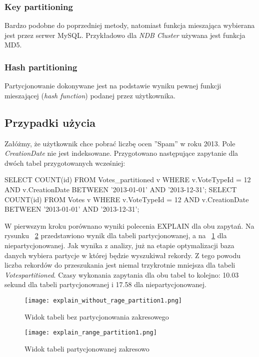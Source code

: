 \subsubsection{Key partitioning}
Bardzo podobne do poprzedniej metody, natomiast funkcja mieszająca wybierana jest przez serwer MySQL. Przykładowo dla \textit{NDB Cluster} używana jest funkcja MD5.
\subsubsection{Hash partitioning}
Partycjonowanie dokonywane jest na podstawie wyniku pewnej funkcji mieszającej (\textit{hash function}) podanej przez użytkownika.

\subsection{Przypadki użycia}
Załóżmy, że użytkownik chce pobrać liczbę ocen ''Spam'' w roku 2013. Pole \textit{CreationDate} nie jest indeksowane. Przygotowano następujące zapytanie dla dwóch tabel przygotowanych wcześniej:
\begin{spverbatim}
	SELECT COUNT(id) FROM Votes_partitioned v WHERE v.VoteTypeId = 12 AND v.CreationDate BETWEEN '2013-01-01' AND '2013-12-31'; 
	SELECT COUNT(id) FROM Votes v WHERE v.VoteTypeId = 12 AND v.CreationDate BETWEEN '2013-01-01' AND '2013-12-31';
\end{spverbatim}
\bigskip
W pierwszym kroku porównano wyniki polecenia EXPLAIN dla obu zapytań. Na rysunku ~\ref{fig:explain_range_partition1} przedstawiono wynik dla tabeli partycjonowanej, a na ~\ref{fig:explain_without_rage_partition1} dla niepartycjonowanej. Jak wynika z analizy, już na etapie optymalizacji baza danych wybiera partycje w której będzie wyszukiwał rekordy. Z tego powodu liczba rekordów do przeszukania jest niemal trzykrotnie mniejsza dla tabeli \textit{Votes\textunderscore partitioned}. Czasy wykonania zapytania dla obu tabel to kolejno: 10.03 sekund dla tabeli partycjonowanej i 17.58 dla niepartycjonowanej.
\begin{figure}
	\centering
	\texttt{[image: explain\_without\_rage\_partition1.png]}
	\caption{Widok tabeli bez partycjonowania zakresowego}
	\label{fig:explain_without_rage_partition1}
\end{figure}
\begin{figure}
	\centering
	\texttt{[image: explain\_range\_partition1.png]}
	\caption{Widok tabeli partycjonowanej zakresowo}
	\label{fig:explain_range_partition1}
\end{figure}

